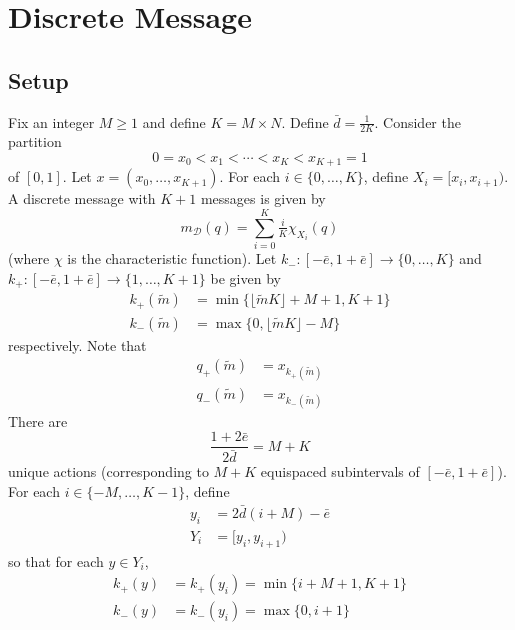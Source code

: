 \documentclass[12pt]{article}
\begin{document}
\section{Discrete Message}
\subsection{Setup}
Fix an integer $M\geq1$ and define $K=M\times N$. Define $\bar{d}=\frac{1}{2K}$. Consider the partition
\begin{equation}\label{eq:partition}
	0=x_{0}<x_{1}<\cdots<x_{K}<x_{K+1}=1
\end{equation}
of $[0,1]$. Let $x=(x_{0},\ldots,x_{K+1})$. For each $i\in\{0,\ldots,K\}$, define $X_{i}=[x_{i},x_{i+1})$. A discrete message with $K+1$ messages is given by
\begin{equation}
	m_{\mathcal{D}}(q)=\sum_{i=0}^{K}{\tfrac{i}{K}\chi_{X_{i}}(q)}
\end{equation}
(where $\chi$ is the characteristic function). Let $k_{-}:[-\bar{e},1+\bar{e}]\rightarrow\{0,\ldots,K\}$ and $k_{+}:[-\bar{e},1+\bar{e}]\rightarrow\{1,\ldots,K+1\}$ be given by
\begin{align}
	k_{+}(\widetilde{m})&=\min\{\lfloor \widetilde{m}K\rfloor+M+1,K+1\}\\
	k_{-}(\widetilde{m})&=\max\{0,\lfloor \widetilde{m}K\rfloor-M\}
\end{align}
respectively. Note that 
\begin{align}
	q_{+}(\widetilde{m})&=x_{k_{+}(\widetilde{m})}\\
	q_{-}(\widetilde{m})&=x_{k_{-}(\widetilde{m})}
\end{align}
There are 
\begin{equation}
	\frac{1+2\bar{e}}{2\bar{d}}=M+K
\end{equation}
unique actions (corresponding to $M+K$ equispaced subintervals of $[-\bar{e},1+\bar{e}]$). For each $i\in\{-M,\ldots,K-1\}$, define
\begin{align}
	y_{i}&=2\bar{d}(i+M)-\bar{e}\\ %
	Y_{i}&=[y_{i},y_{i+1})
\end{align}
so that for each $y\in Y_{i}$, 
\begin{align}
	k_{+}(y)&=k_{+}(y_{i})=\min\{i+M+1,K+1\}\\
	k_{-}(y)&=k_{-}(y_{i})=\max\{0,i+1\}
\end{align}
\end{document}
